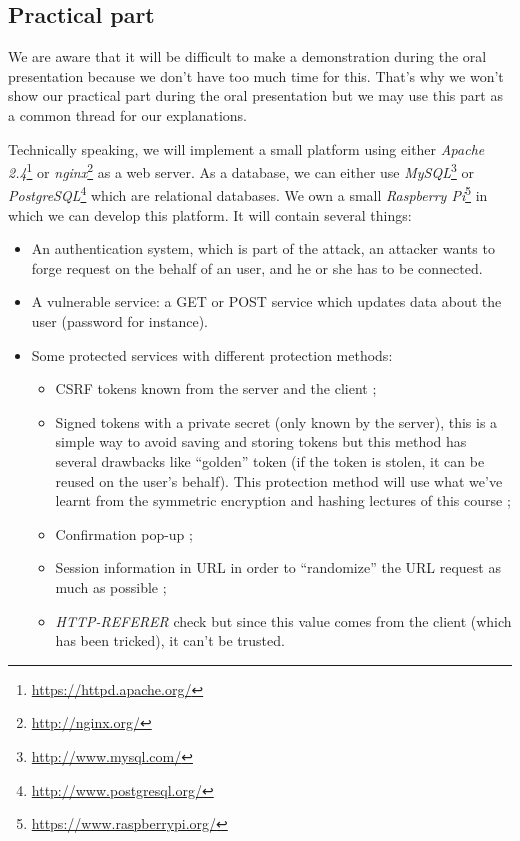 \documentclass[a4paper,11pt]{article}
\begin{document}
  \subsection{Practical part}
  
  We are aware that it will be difficult to make a demonstration during the oral presentation 
  because we don't have too much time for this. That's why we won't show our practical part 
  during the oral presentation but we may use this part as a common thread for our explanations. 
  
  Technically speaking, we will implement a small platform using either \textit{Apache 2.4}\footnote{\url{https://httpd.apache.org/}} or \textit{nginx}\footnote{\url{http://nginx.org/}} as a web 
  server. As a database, we can either use \textit{MySQL}\footnote{\url{http://www.mysql.com/}} or \textit{PostgreSQL}\footnote{\url{http://www.postgresql.org/}} which are relational databases. We own a small \textit{Raspberry Pi}\footnote{\url{https://www.raspberrypi.org/}} 
  in which we can develop this platform. It will contain several things:
  \begin{itemize}
   \item An authentication system, which is part of the attack, an attacker wants to forge request on the behalf of an user, and he or she has to be connected.
   \item A vulnerable service: a GET or POST service which updates data about the user (password for instance).
   \item Some protected services with different protection methods:
   \begin{itemize}
    \item CSRF tokens known from the server and the client ;
    \item Signed tokens with a private secret (only known by the server), this is a simple way to avoid saving and storing tokens but this method has several drawbacks like ``golden'' token (if the token is stolen, it can be reused on the user's behalf). This protection method will use what we've learnt from the symmetric encryption and hashing lectures of this course ;
    \item Confirmation pop-up ;
    \item Session information in URL in order to ``randomize'' the URL request as much as possible ;
    \item \textit{HTTP-REFERER} check but since this value comes from the client (which has been tricked), it can't be trusted.
   \end{itemize}
  \end{itemize}
  
\end{document}
